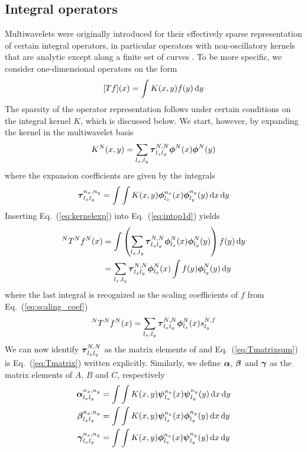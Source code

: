 \subsection{Integral operators}
Multiwavelets were originally introduced for their effectively sparse 
representation of certain integral operators, in particular operators with 
non-oscillatory kernels that are analytic except along a finite set of 
curves \cite{Alpert}. To be more specific, we consider one-dimensional operators
on the form
\begin{equation}
    \label{eq:intop1d}
    [Tf](x) = \int K(x,y) f(y) \,\mathrm{d} y
\end{equation}
The sparsity of the operator representation follows under certain conditions 
on the integral kernel $K$, which is discussed below. We start, however, by 
expanding the kernel in the multiwavelet basis
\begin{equation}
    \label{eq:kernelexp}
    K^N(x,y) = \sum_{l_x,l_y}\boldsymbol \tau^{N,N}_{l_xl_y} 
	\boldsymbol{\phi}^N(x)\boldsymbol{\phi}^N(y)
\end{equation}
where the expansion coefficients are given by the integrals
\begin{equation}
    \label{eq:taudef}
    \boldsymbol \tau^{n_x,n_y}_{l_xl_y} = \int\int
	K(x,y)\boldsymbol{\phi}^{n_x}_{l_x}(x)\boldsymbol{\phi}^{n_y}_{l_y}(y)\,\mathrm{d} x \,\mathrm{d} y
\end{equation}
Inserting Eq.~(\ref{eq:kernelexp}) into Eq.~(\ref{eq:intop1d}) yields
\begin{align}
    \nonumber
    ^{N}T^{N}{f}^{N}(x) &= \int\left(\sum_{l_x,l_y} \boldsymbol \tau^{N,N}_{l_xl_y}
	\boldsymbol{\phi}^N_{l_x}(x)\boldsymbol{\phi}^N_{l_y}(y)\right)f(y)\,\mathrm{d} y\\
	&= \sum_{l_x,l_y} \boldsymbol \tau^{N,N}_{l_xl_y}
	\boldsymbol{\phi}^N_{l_x}(x)\int f(y)\boldsymbol{\phi}^N_{l_y}(y)\,\mathrm{d} y
\end{align}
where the last integral is recognized as the scaling coefficients of $f$ from 
Eq.~(\ref{eq:scaling_coef})
\begin{equation}
    \label{eq:Tmatrixsum}
    ^{N}T^{N}{f}^{N}(x) = \sum_{l_x,l_y} \boldsymbol \tau^{N,N}_{l_xl_y}
	\boldsymbol{\phi}^N_{l_x}(x)s^{N,f}_{l_y}
\end{equation}
We can now identify $\boldsymbol \tau^{N,N}_{l_xl_y}$ as the matrix elements of  
and Eq.~(\ref{eq:Tmatrixsum}) is Eq.~(\ref{eq:Tmatrix}) written explicitly. 
Similarly, we define $\boldsymbol \alpha$, $\boldsymbol \beta$ and $\boldsymbol \gamma$ as the matrix 
elements of $A$, $B$ and $C$, respectively
\begin{align}
	\label{eq:tcbadef}
	\begin{split}
	\boldsymbol \alpha^{n_x,n_y}_{l_xl_y} &= \int\int
	K(x,y)\boldsymbol{\psi}^{n_x}_{l_x}(x)\boldsymbol{\psi}^{n_y}_{l_y}(y)\,\mathrm{d} x \,\mathrm{d} y\\
	\boldsymbol \beta^{n_x,n_y}_{l_xl_y} &= \int\int
	K(x,y)\boldsymbol{\psi}^{n_x}_{l_x}(x)\boldsymbol{\phi}^{n_y}_{l_y}(y)\,\mathrm{d} x \,\mathrm{d} y\\
	\boldsymbol \gamma^{n_x,n_y}_{l_xl_y} &= \int\int
	K(x,y)\boldsymbol{\phi}^{n_x}_{l_x}(x)\boldsymbol{\psi}^{n_y}_{l_y}(y)\,\mathrm{d} x \,\mathrm{d} y
	\end{split}
\end{align}
